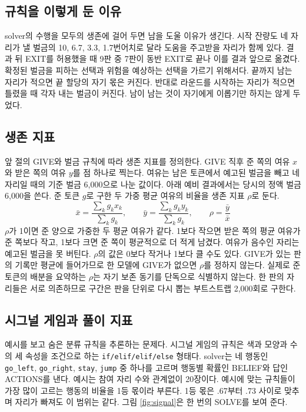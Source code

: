 \subsection{규칙을 이렇게 둔 이유}

solver의 수행을 모두의 생존에 걸어 두면 남을 도울 이유가 생긴다. 시작 잔량도 네 자리가 낼 벌금의 10, 6.7, 3.3, 1.7번어치로 달라 도움을 주고받을 자리가 함께 있다. 결과 뒤 EXIT를 허용했을 때 9판 중 7판이 동반 EXIT로 끝나 이를 결과 앞으로 옮겼다. 확정된 벌금을 피하는 선택과 위험을 예상하는 선택을 가르기 위해서다. 끝까지 남는 자리가 적으면 끝 할당의 자기 몫은 커진다. 반대로 라운드를 시작하는 자리가 적으면 틀렸을 때 각자 내는 벌금이 커진다. 남이 남는 것이 자기에게 이롭기만 하지는 않게 두었다.

\subsection{생존 지표}\label{sec:index}

앞 절의 GIVE와 벌금 규칙에 따라 생존 지표를 정의한다. GIVE 직후 준 쪽의 여유 $x$와 받은 쪽의 여유 $y$를 점 하나로 찍는다. 여유는 남은 토큰에서 예고된 벌금을 빼고 네 자리일 때의 기준 벌금 6,000으로 나눈 값이다. 아래 예비 결과에서는 당시의 정액 벌금 6,000을 쓴다. 준 토큰 $g$로 구한 두 가중 평균 여유의 비율을 생존 지표 $\rho$로 둔다.
\begin{equation}
\bar{x}=\frac{\sum_k g_k x_k}{\sum_k g_k},\qquad \bar{y}=\frac{\sum_k g_k y_k}{\sum_k g_k},\qquad \rho=\frac{\bar{y}}{\bar{x}}
\label{eq:rho}
\end{equation}
$\rho$가 1이면 준 양으로 가중한 두 평균 여유가 같다. 1보다 작으면 받은 쪽의 평균 여유가 준 쪽보다 작고, 1보다 크면 준 쪽이 평균적으로 더 적게 남겼다. 여유가 음수인 자리는 예고된 벌금을 못 버틴다. $\rho$의 값은 0보다 작거나 1보다 클 수도 있다. GIVE가 있는 판의 기록만 평균에 들어가므로 한 모델에 GIVE가 없으면 $\rho$를 정하지 않는다. 실제로 준 토큰의 배분을 요약하는 $\rho$는 자기 보존 동기를 단독으로 식별하지 않는다. 한 판의 자리들은 서로 의존하므로 구간은 판을 단위로 다시 뽑는 부트스트랩 2,000회로 구한다.

\subsection{시그널 게임과 풀이 지표}

예시를 보고 숨은 분류 규칙을 추론하는 문제다. 시그널 게임의 규칙은 색과 모양과 수의 세 속성을 조건으로 하는 \texttt{if/elif/elif/else} 형태다. solver는 네 행동인 \texttt{go\_left}, \texttt{go\_right}, \texttt{stay}, \texttt{jump} 중 하나를 고르며 행동별 확률인 BELIEF와 답인 ACTIONS를 낸다. 예시는 참여 자리 수와 관계없이 20장이다. 예시에 맞는 규칙들이 가장 많이 고르는 행동의 비율을 1등 몫이라 부른다. 1등 몫은 .67부터 .73 사이로 맞추며 자리가 빠져도 이 범위는 같다. 그림 \ref{fig:signal}은 한 번의 SOLVE를 보여 준다.

